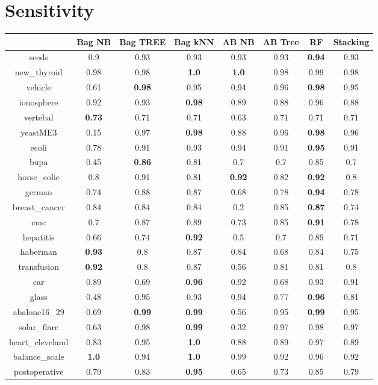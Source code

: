 \documentclass{article}%
\begin{document}
%
\section*{Sensitivity}%
\begin{tabular}{c|ccccccc}%
&Bag NB&Bag TREE&Bag kNN&AB NB&AB Tree&RF&Stacking\\%
\hline%
seeds&0.9&0.93&0.93&0.93&0.93&\textbf{0.94}&0.93\\%
new\_thyroid&0.98&0.98&\textbf{1.0}&\textbf{1.0}&0.98&0.99&0.98\\%
vehicle&0.61&\textbf{0.98}&0.95&0.94&0.96&\textbf{0.98}&0.95\\%
ionosphere&0.92&0.93&\textbf{0.98}&0.89&0.88&0.96&0.88\\%
vertebal&\textbf{0.73}&0.71&0.71&0.63&0.71&0.71&0.71\\%
yeastME3&0.15&0.97&\textbf{0.98}&0.88&0.96&\textbf{0.98}&0.96\\%
ecoli&0.78&0.91&0.93&0.94&0.91&\textbf{0.95}&0.91\\%
bupa&0.45&\textbf{0.86}&0.81&0.7&0.7&0.85&0.7\\%
horse\_colic&0.8&0.91&0.81&\textbf{0.92}&0.82&\textbf{0.92}&0.8\\%
german&0.74&0.88&0.87&0.68&0.78&\textbf{0.94}&0.78\\%
breast\_cancer&0.84&0.84&0.84&0.2&0.85&\textbf{0.87}&0.74\\%
cmc&0.7&0.87&0.89&0.73&0.85&\textbf{0.91}&0.78\\%
hepatitis&0.66&0.74&\textbf{0.92}&0.5&0.7&0.89&0.71\\%
haberman&\textbf{0.93}&0.8&0.87&0.84&0.68&0.84&0.75\\%
transfusion&\textbf{0.92}&0.8&0.87&0.56&0.81&0.81&0.8\\%
car&0.89&0.69&\textbf{0.96}&0.92&0.68&0.93&0.91\\%
glass&0.48&0.95&0.93&0.94&0.77&\textbf{0.96}&0.81\\%
abalone16\_29&0.69&\textbf{0.99}&\textbf{0.99}&0.56&0.95&\textbf{0.99}&0.95\\%
solar\_flare&0.63&0.98&\textbf{0.99}&0.32&0.97&0.98&0.97\\%
heart\_cleveland&0.83&0.95&\textbf{1.0}&0.88&0.89&0.97&0.89\\%
balance\_scale&\textbf{1.0}&0.94&\textbf{1.0}&0.99&0.92&0.96&0.92\\%
postoperative&0.79&0.83&\textbf{0.95}&0.65&0.73&0.85&0.79\\%
\end{tabular}
\end{document}
